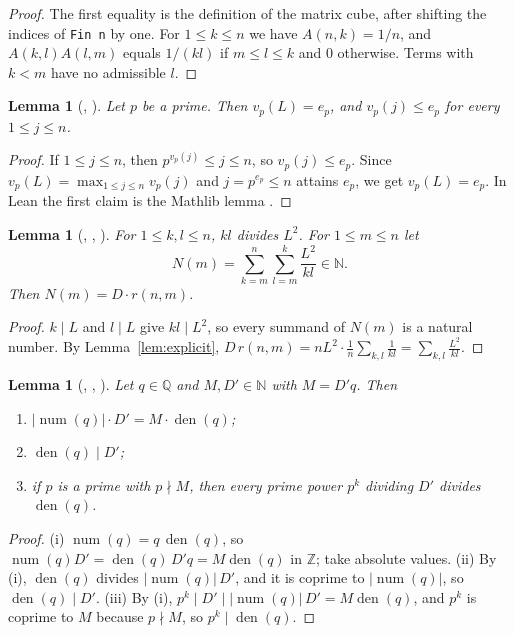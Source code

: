 \documentclass[11pt]{amsart}
\theoremstyle{plain}
\newtheorem{lemma}[theorem]{Lemma}
\theoremstyle{definition}
\newcommand{\code}[1]{\texttt{#1}}
\newcommand{\N}{\mathbb{N}}
\newcommand{\Z}{\mathbb{Z}}
\newcommand{\Q}{\mathbb{Q}}
\DeclareMathOperator{\den}{den}
\DeclareMathOperator{\num}{num}
\begin{document}
\begin{proof}
The first equality is the definition of the matrix cube, after shifting the indices of \code{Fin n} by one. For $1\le k\le n$ we have $A(n,k)=1/n$, and $A(k,l)A(l,m)$ equals $1/(kl)$ if $m\le l\le k$ and $0$ otherwise. Terms with $k<m$ have no admissible $l$.
\end{proof}

\begin{lemma}[, ]\label{lem:val}
Let $p$ be a prime. Then $v_p(L)=e_p$, and $v_p(j)\le e_p$ for every $1\le j\le n$.
\end{lemma}

\begin{proof}
If $1\le j\le n$, then $p^{v_p(j)}\le j\le n$, so $v_p(j)\le e_p$. Since $v_p(L)=\max_{1\le j\le n}v_p(j)$ and $j=p^{e_p}\le n$ attains $e_p$, we get $v_p(L)=e_p$. In Lean the first claim is the Mathlib lemma .
\end{proof}

\begin{lemma}[, , ]\label{lem:N}
For $1\le k,l\le n$, $kl$ divides $L^2$. For $1\le m\le n$ let
\[
  N(m)=\sum_{k=m}^n\sum_{l=m}^k\frac{L^2}{kl}\in\N .
\]
Then $N(m)=D\cdot r(n,m)$.
\end{lemma}

\begin{proof}
$k\mid L$ and $l\mid L$ give $kl\mid L^2$, so every summand of $N(m)$ is a natural number. By Lemma~\ref{lem:explicit}, $D\,r(n,m)=nL^2\cdot\frac1n\sum_{k,l}\frac1{kl}=\sum_{k,l}\frac{L^2}{kl}$.
\end{proof}

\begin{lemma}[, , ]\label{lem:den}
Let $q\in\Q$ and $M,D'\in\N$ with $M=D'q$. Then
\begin{enumerate}
\item[(i)] $|\num(q)|\cdot D'=M\cdot\den(q)$;
\item[(ii)] $\den(q)\mid D'$;
\item[(iii)] if $p$ is a prime with $p\nmid M$, then every prime power $p^k$ dividing $D'$ divides $\den(q)$.
\end{enumerate}
\end{lemma}

\begin{proof}
(i) $\num(q)=q\,\den(q)$, so $\num(q)D'=\den(q)\,D'q=M\den(q)$ in $\Z$; take absolute values. (ii) By (i), $\den(q)$ divides $|\num(q)|\,D'$, and it is coprime to $|\num(q)|$, so $\den(q)\mid D'$. (iii) By (i), $p^k\mid D'\mid|\num(q)|\,D'=M\den(q)$, and $p^k$ is coprime to $M$ because $p\nmid M$, so $p^k\mid\den(q)$.
\end{proof}
\end{document}
